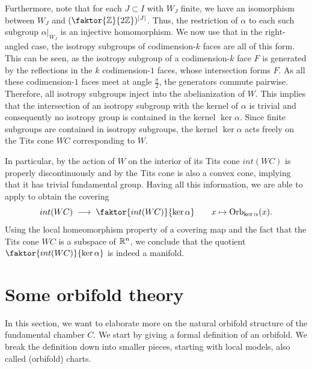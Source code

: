 Furthermore, note that for each \(J \subset I\) with \(W_J\) finite, we have an isomorphism between \(W_J\) and \((\faktor{\Z}{2\Z})^{\abs{J}}\).
Thus, the restriction of \(\alpha\) to each such subgroup \(\alpha\vert_{W_J}\) is an injective homomorphism.
We now use that in the right-angled case, the isotropy subgroups of codimension-\(k\) faces are all of this form.
This can be seen, as the isotropy subgroup of a codimension-\(k\) face \(F\) is generated by the reflections in the \(k\) codimension-\(1\) faces, whose intersection forms \(F\).
As all these codimension-\(1\) faces meet at angle \(\frac{\pi}{2}\), the generators commute pairwise.
Therefore, all isotropy subgroups inject into the abelianization of \(W\).
This implies that the intersection of an isotropy subgroup with the kernel of \(\alpha\) is trivial and consequently no isotropy group is contained in the kernel \(\ker\alpha\).
Since finite subgroups are contained in isotropy subgroups, the kernel \(\ker\alpha\) acts freely on the Tits cone \(WC\) corresponding to \(W\).

In particular, by  the action of \(W\) on the interior of its Tits cone \(int(WC)\) is properly discontinuously and by  the Tits cone is also a convex cone, implying that it has trivial fundamental group.
Having all this information, we are able to apply  to obtain the covering
\[int(WC) \;\longrightarrow\; \faktor{int(WC)}{\ker\alpha} \qquad x \mapsto \text{Orb}_{\ker\alpha}(x).\]
Using the local homeomorphism property of a covering map and the fact that the Tits cone \(WC\) is a subspace of \(\mathbb{R}^n\), we conclude that the quotient \(\faktor{int(WC)}{\ker\alpha}\) is indeed a manifold.

    


\section{Some orbifold theory}

In this section, we want to elaborate more on the natural orbifold structure of the fundamental chamber \(C\).
We start by giving a formal definition of an orbifold.
We break the definition down into smaller pieces, starting with local models, also called (orbifold) charts.

